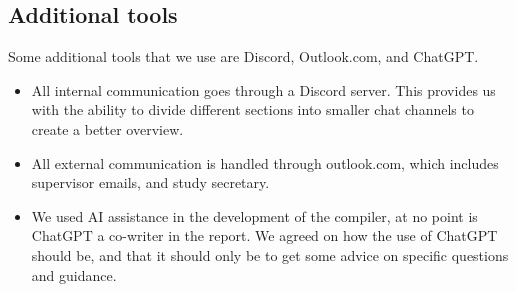 \subsection{Additional tools}
Some additional tools that we use are Discord, Outlook.com, and ChatGPT. 
\begin{itemize}
    \item All internal communication goes through a Discord server. This provides us with the ability to divide different sections into smaller chat channels to create a better overview.
    \item All external communication is handled through outlook.com, which includes supervisor emails, and study secretary.
    \item We used AI assistance in the development of the compiler, at no point is ChatGPT a co-writer in the report. We agreed on how the use of ChatGPT should be, and that it should only be to get some advice on specific questions and guidance.
\end{itemize}

\begin{comment}
   
\begin{itemize}
    \item Discord is a VoIP and instant messaging social platform. Users have the ability to communicate with voice calls, video calls, text messaging, media, and files in private chats or as part of communities called "servers" \cite{discordwikipedia}. All internal communication goes through the group's Discord server. This provides us with the ability to divide different sections into smaller chat channels to create a better overview. This is also used when the group works at home, as you are able to talk with each other through voice channels, just like e.g. Microsoft Teams.
    \item Outlook.com is a free webmail version of Microsoft Outlook, using a similar user interface \cite{outlookwikipedia}. 
    \item ChatGPT is an artificial intelligence (AI) chatbot developed by OpenAI and released in November 2022. The "Chat" in the name is a reference to it being a chatbot, and the "GPT" stands for generative pre-trained transformer—a type of large language model (LLM) \cite{chatgptwikipedia}. 
\end{itemize}
 
\end{comment}